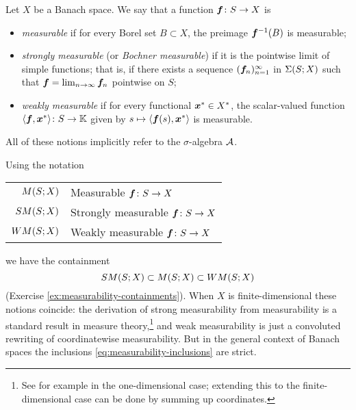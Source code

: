 \begin{defn}
  Let $X$ be a Banach space.
  We say that a function $\bm{f} \colon S \rightarrow X$ is
  \begin{itemize}
  \item
    \emph{measurable} if for every Borel set $B \subset X$, the preimage $\bm{f}^{-1}(B)$ is measurable;
  \item
    \emph{strongly measurable} (or \emph{Bochner measurable}) if it is the pointwise limit of simple functions; that is, if there exists a sequence $(\bm{f}_n)_{n=1}^\infty$ in $\Sigma(S;X)$ such that $\bm{f} = \lim_{n \to \infty} \bm{f}_n$ pointwise on $S$;
  \item
    \emph{weakly measurable} if for every functional $\bm{x}^* \in X^*$, the scalar-valued function $\langle \bm{f}, \bm{x}^*\rangle \colon S \rightarrow \mathbb{K}$ given by $s \mapsto \langle \bm{f}(s), \bm{x}^* \rangle$ is measurable.
  \end{itemize}
  All of these notions implicitly refer to the $\sigma$-algebra $\mathcal{A}$.
\end{defn}

Using the notation
\begin{center}
  \begin{tabular}{r|l}
    $M (S;X)$  & Measurable $\bm{f} \colon S \rightarrow X$    \\
    $SM(S;X)$  & Strongly measurable $\bm{f} \colon S \rightarrow X$ \\
    $WM(S;X)$  & Weakly measurable $\bm{f} \colon S \rightarrow X$
  \end{tabular}
\end{center}
we have the containment
\begin{equation}\label{eq:measurability-inclusions}
  SM(S;X) \subset M(S;X) \subset WM(S;X)
\end{equation}
(Exercise \ref{ex:measurability-containments}).
When $X$ is finite-dimensional these notions coincide: the derivation of strong measurability from measurability is a standard result in measure theory,\footnote{See for example \cite[Corollary 4.2.7]{rD04} in the one-dimensional case; extending this to the finite-dimensional case can be done by summing up coordinates.} and weak measurability is just a convoluted rewriting of coordinatewise measurability.
But in the general context of Banach spaces the inclusions \eqref{eq:measurability-inclusions} are strict.

